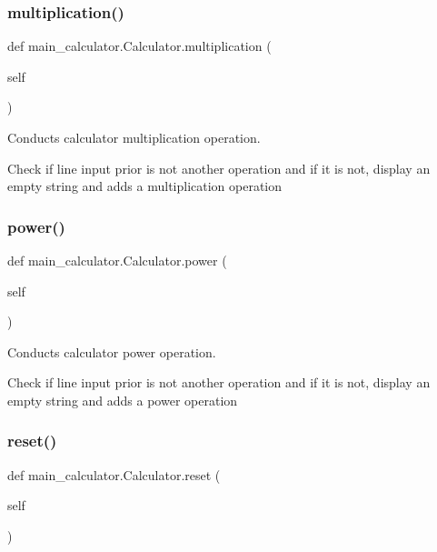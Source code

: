 \subsubsection{\texorpdfstring{multiplication()}{multiplication()}}
{\footnotesize\ttfamily def main\+\_\+calculator.\+Calculator.\+multiplication (\begin{DoxyParamCaption}\item[{}]{self }\end{DoxyParamCaption})}



Conducts calculator multiplication operation. 

Check if line input prior is not another operation and if it is not, display an empty string and adds a multiplication operation \mbox{\label{classmain__calculator_1_1_calculator_a744ccd099c8deb999062579a9d8aa152}} 
\subsubsection{\texorpdfstring{power()}{power()}}
{\footnotesize\ttfamily def main\+\_\+calculator.\+Calculator.\+power (\begin{DoxyParamCaption}\item[{}]{self }\end{DoxyParamCaption})}



Conducts calculator power operation. 

Check if line input prior is not another operation and if it is not, display an empty string and adds a power operation \mbox{\label{classmain__calculator_1_1_calculator_aac4299e4225a6aeeb11bc5410d900707}} 
\subsubsection{\texorpdfstring{reset()}{reset()}}
{\footnotesize\ttfamily def main\+\_\+calculator.\+Calculator.\+reset (\begin{DoxyParamCaption}\item[{}]{self }\end{DoxyParamCaption})}



